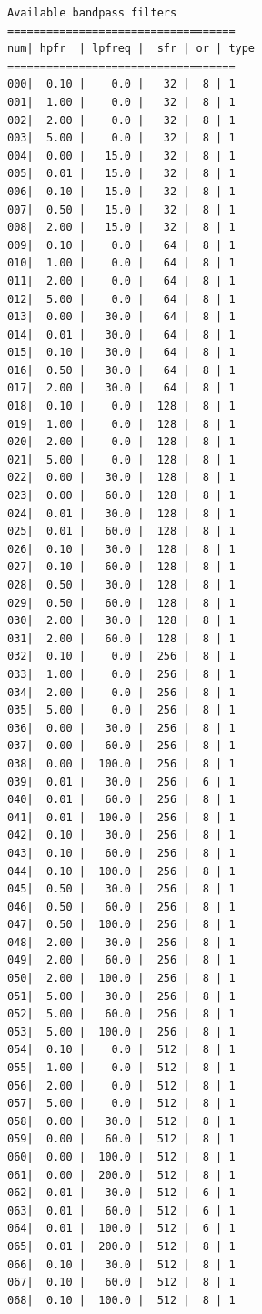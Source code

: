 \documentclass[letterpaper, oneside, 12pt]{article}
\begin{document}
\begin{verbatim}
Available bandpass filters
===================================
num| hpfr  | lpfreq |  sfr | or | type
===================================
000|  0.10 |    0.0 |   32 |  8 | 1
001|  1.00 |    0.0 |   32 |  8 | 1
002|  2.00 |    0.0 |   32 |  8 | 1
003|  5.00 |    0.0 |   32 |  8 | 1
004|  0.00 |   15.0 |   32 |  8 | 1
005|  0.01 |   15.0 |   32 |  8 | 1
006|  0.10 |   15.0 |   32 |  8 | 1
007|  0.50 |   15.0 |   32 |  8 | 1
008|  2.00 |   15.0 |   32 |  8 | 1
009|  0.10 |    0.0 |   64 |  8 | 1
010|  1.00 |    0.0 |   64 |  8 | 1
011|  2.00 |    0.0 |   64 |  8 | 1
012|  5.00 |    0.0 |   64 |  8 | 1
013|  0.00 |   30.0 |   64 |  8 | 1
014|  0.01 |   30.0 |   64 |  8 | 1
015|  0.10 |   30.0 |   64 |  8 | 1
016|  0.50 |   30.0 |   64 |  8 | 1
017|  2.00 |   30.0 |   64 |  8 | 1
018|  0.10 |    0.0 |  128 |  8 | 1
019|  1.00 |    0.0 |  128 |  8 | 1
020|  2.00 |    0.0 |  128 |  8 | 1
021|  5.00 |    0.0 |  128 |  8 | 1
022|  0.00 |   30.0 |  128 |  8 | 1
023|  0.00 |   60.0 |  128 |  8 | 1
024|  0.01 |   30.0 |  128 |  8 | 1
025|  0.01 |   60.0 |  128 |  8 | 1
026|  0.10 |   30.0 |  128 |  8 | 1
027|  0.10 |   60.0 |  128 |  8 | 1
028|  0.50 |   30.0 |  128 |  8 | 1
029|  0.50 |   60.0 |  128 |  8 | 1
030|  2.00 |   30.0 |  128 |  8 | 1
031|  2.00 |   60.0 |  128 |  8 | 1
032|  0.10 |    0.0 |  256 |  8 | 1
033|  1.00 |    0.0 |  256 |  8 | 1
034|  2.00 |    0.0 |  256 |  8 | 1
035|  5.00 |    0.0 |  256 |  8 | 1
036|  0.00 |   30.0 |  256 |  8 | 1
037|  0.00 |   60.0 |  256 |  8 | 1
038|  0.00 |  100.0 |  256 |  8 | 1
039|  0.01 |   30.0 |  256 |  6 | 1
040|  0.01 |   60.0 |  256 |  8 | 1
041|  0.01 |  100.0 |  256 |  8 | 1
042|  0.10 |   30.0 |  256 |  8 | 1
043|  0.10 |   60.0 |  256 |  8 | 1
044|  0.10 |  100.0 |  256 |  8 | 1
045|  0.50 |   30.0 |  256 |  8 | 1
046|  0.50 |   60.0 |  256 |  8 | 1
047|  0.50 |  100.0 |  256 |  8 | 1
048|  2.00 |   30.0 |  256 |  8 | 1
049|  2.00 |   60.0 |  256 |  8 | 1
050|  2.00 |  100.0 |  256 |  8 | 1
051|  5.00 |   30.0 |  256 |  8 | 1
052|  5.00 |   60.0 |  256 |  8 | 1
053|  5.00 |  100.0 |  256 |  8 | 1
054|  0.10 |    0.0 |  512 |  8 | 1
055|  1.00 |    0.0 |  512 |  8 | 1
056|  2.00 |    0.0 |  512 |  8 | 1
057|  5.00 |    0.0 |  512 |  8 | 1
058|  0.00 |   30.0 |  512 |  8 | 1
059|  0.00 |   60.0 |  512 |  8 | 1
060|  0.00 |  100.0 |  512 |  8 | 1
061|  0.00 |  200.0 |  512 |  8 | 1
062|  0.01 |   30.0 |  512 |  6 | 1
063|  0.01 |   60.0 |  512 |  6 | 1
064|  0.01 |  100.0 |  512 |  6 | 1
065|  0.01 |  200.0 |  512 |  8 | 1
066|  0.10 |   30.0 |  512 |  8 | 1
067|  0.10 |   60.0 |  512 |  8 | 1
068|  0.10 |  100.0 |  512 |  8 | 1

\end{verbatim}
\end{document}
